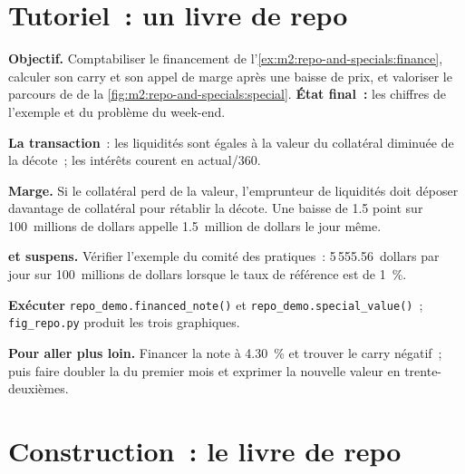 \section{Tutoriel~: un livre de repo}\label{tut:m2:repo-and-specials:book}

\begin{tutorial}
\textbf{Objectif.} Comptabiliser le financement de l'\cref{ex:m2:repo-and-specials:finance},
calculer son carry et son appel de marge après une baisse de prix, et valoriser le
parcours de  de la \cref{fig:m2:repo-and-specials:special}. \textbf{État
final~:} les chiffres de l'exemple et du problème du week-end.
\begin{tutsteps}
\item \textbf{La transaction}~: les liquidités sont égales à la valeur du collatéral diminuée de la décote~; les intérêts
courent en actual/360.
\label{lst:m2:repo-and-specials:trade}
\item \textbf{Marge.} Si le collatéral perd de la valeur, l'emprunteur de liquidités doit
déposer davantage de collatéral pour rétablir la décote.
\label{lst:m2:repo-and-specials:margin}
Une baisse de 1.5 point sur 100~millions de dollars appelle 1.5~million de dollars le jour même.
\item \textbf{ et suspens.}
\label{lst:m2:repo-and-specials:special}
Vérifier l'exemple du comité des pratiques~: 5\,555.56~dollars par jour sur 100~millions
de dollars lorsque le taux de référence est de 1~\%.
\item \textbf{Exécuter} \texttt{repo\_demo.financed\_note()} et
\texttt{repo\_demo.special\_value()}~; \texttt{fig\_repo.py} produit les trois
graphiques.
\end{tutsteps}
\textbf{Pour aller plus loin.} Financer la note à 4.30~\% et trouver le
carry négatif~; puis faire doubler la  du premier mois et
exprimer la nouvelle valeur en trente-deuxièmes.
\end{tutorial}

\section{Construction~: le livre de repo}\label{bld:m2:repo-and-specials:book}

